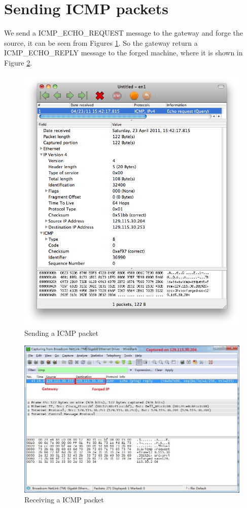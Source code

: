 \documentclass[12pt,letterpaper]{report}
\begin{document}
\section*{Sending ICMP packets}
We send a ICMP\_ECHO\_REQUEST message to the gateway 
and forge the source, it can be seen from Figures \ref{icmp1}. So 
the gateway return a ICMP\_ECHO\_REPLY message to the 
forged machine, where it is shown in Figure \ref{icmp2}.

\begin{figure}[!htp]
\centering
\includegraphics[width=0.8\linewidth]{icmp1.png}
\caption{Sending a ICMP packet}
\label{icmp1}
\end{figure}


\begin{figure}[!htp]
\centering
\includegraphics[width=\linewidth]{icmp2.jpg}
\caption{Receiving a ICMP packet}
\label{icmp2}
\end{figure}



\end{document}
